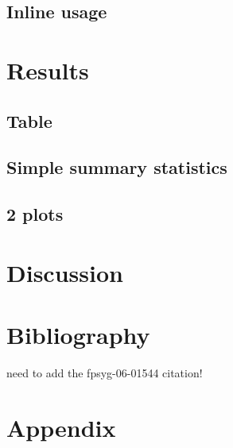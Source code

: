 \documentclass{article}
\begin{document}
\subsection{Inline usage}
\label{sec:org3cbd48e}

\section{Results}
\label{sec:org788aa06}
\subsection{Table}
\label{sec:org80256a4}
\subsection{Simple summary statistics}
\label{sec:orgdab3b3b}
\subsection{2 plots}
\label{sec:orgea51341}

\section{Discussion}
\label{sec:org8750a49}

\section{Bibliography}
\label{sec:org4bd4b13}
need to add the fpsyg-06-01544 citation!


\section{Appendix}
\label{sec:org6d6bc55}
\end{document}
